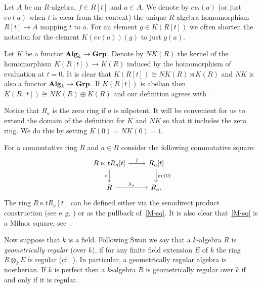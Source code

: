 \documentclass[oneside, 11pt]{amsart} \pdfoutput=1
\begin{document}
Let $A$ be an $R$-algebra, $f\in R[t]$ and $a \in A$. We denote by $ev_t(a)$ (or just $ev(a)$ when $t$ is clear from the context) the unique $R$-algebra homomorphism $R[t] \to A$ mapping $t$ to $a$. For an element $g \in K(R[t])$ we often shorten the notation for the element $K(ev(a))(g)$ to just $g(a)$.

\begin{df}\label{df:NK}
Let $K$ be a functor ${\normalfont\textbf{Alg}}_k \to {\normalfont\textbf{Grp}}$.
Denote by $NK(R)$ the kernel of the homomorphism $K(R[t]) \to K(R)$ induced by the homomorphism of evaluation at $t=0$. It is clear that $K(R[t]) \cong NK(R) \rtimes K(R)$ and $NK$ is also a functor ${\normalfont\textbf{Alg}}_k \to {\normalfont\textbf{Grp}}$. If $K(R[t])$ is abelian then $K(R[t]) \cong NK(R) \oplus K(R)$ and our definition agrees with~\cite[Def.~III.3.3]{Kbook}.
\end{df}

Notice that $R_a$ is the zero ring if $a$ is nilpotent. It will be convenient for us to extend the domain of the definition for $K$ and $NK$ so that it includes the zero ring. We do this by setting $K(0) = NK(0) = 1$.

For a commutative ring $R$ and $a \in R$ consider the following commutative square:
  \begin{equation} \label{M-sq} \begin{tikzcd} R \ltimes t R_a[t] \ar{r}{l} \ar{d}[swap]{e} & R_a[t] \ar{d}{ev(0)} \\ R \ar{r}{\lambda_a} & R_a. \end{tikzcd}\end{equation}
  The ring $R \ltimes tR_a[t]$ can be defined either via the semidirect product construction (see e.\,g. \cite[Definition~3.2]{S15}) or as the pullback of~\eqref{M-sq}.
  It is also clear that~\eqref{M-sq} is a Milnor square, see~\cite[Example~I.2.6]{Kbook}.

Now suppose that $k$ is a field. Following Swan we say that a $k$-algebra $R$ is {\it geometrically regular} (over $k$), if for any finite field extension $E$ of $k$ the ring $R\otimes_kE$ is regular (cf.~\cite[p.~137]{Sw98}). In particular, a geometrically regular algebra is noetherian. If $k$ is perfect then a $k$-algebra $R$ is geometrically regular over $k$ if and only if it is regular.
\end{document}
